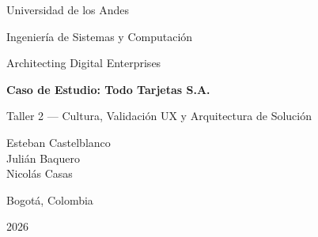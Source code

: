 \documentclass[12pt]{article}
\begin{document}

\begin{titlepage}
    \centering
    \vspace*{2cm}

    {\large Universidad de los Andes \par}
    \vspace{0.3cm}
    {\large Ingeniería de Sistemas y Computación \par}
    \vspace{0.3cm}
    {\large Architecting Digital Enterprises \par}

    \vspace{2.5cm}

    {\LARGE \textbf{Caso de Estudio: Todo Tarjetas S.A.} \par}
    \vspace{0.8cm}
    {\Large Taller 2 --- Cultura, Validación UX y Arquitectura de Solución \par}

    \vspace{3cm}

    {\large
        Esteban Castelblanco \\[0.3cm]
        Julián Baquero \\[0.3cm]
        Nicolás Casas \par
    }

    \vfill

    {\large Bogotá, Colombia \par}
    \vspace{0.3cm}
    {\large 2026 \par}

    \vspace{2cm}
\end{titlepage}


\newpage

\newpage

\end{document}
